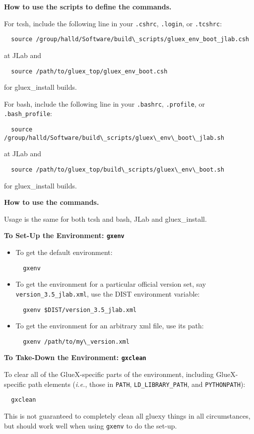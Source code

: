 \documentclass[12pt]{article}
\begin{document}
\begin{description}
\item{\bf How to use the scripts to define the commands.}

For tcsh, include the following line in your {\tt .cshrc}, {\tt .login}, or {\tt .tcshrc}:
\begin{verbatim}
  source /group/halld/Software/build\_scripts/gluex_env_boot_jlab.csh
\end{verbatim}
at JLab and
\begin{verbatim}
  source /path/to/gluex_top/gluex_env_boot.csh
\end{verbatim}
for gluex\_install builds.

For bash, include the following line in your {\tt .bashrc}, {\tt .profile}, or {\tt .bash\_profile}:
\begin{verbatim}
  source /group/halld/Software/build\_scripts/gluex\_env\_boot\_jlab.sh
\end{verbatim}
at JLab and
\begin{verbatim}
  source /path/to/gluex_top/build\_scripts/gluex\_env\_boot.sh
\end{verbatim}
for gluex\_install builds.

\item{\bf How to use the commands.}

Usage is the same for both tcsh and bash, JLab and gluex\_install.

\begin{description}
\item{\bf To Set-Up the Environment: {\tt gxenv}}

\begin{itemize}
\item To get the default environment:
\begin{verbatim}
  gxenv
\end{verbatim}
\item To get the environment for a particular official version set, say {\tt version\_3.5\_jlab.xml}, use the {DIST} environment variable:
\begin{verbatim}
  gxenv $DIST/version_3.5_jlab.xml
\end{verbatim}
\item To get the environment for an arbitrary xml file, use its path:
\begin{verbatim}
  gxenv /path/to/my\_version.xml
\end{verbatim}
\end{itemize}

\item{\bf To Take-Down the Environment: {\tt gxclean}}

To clear all of the GlueX-specific parts of the environment, including
GlueX-specific path elements ({\it i.e.}, those in {\tt PATH}, {\tt LD\_LIBRARY\_PATH}, and {\tt PYTHONPATH}):
\begin{verbatim}
  gxclean
\end{verbatim}
This is not guaranteed to completely clean all gluexy things in all
circumstances, but should work well when using {\tt gxenv} to do the
set-up.

\end{description}
\end{description}
\end{document}
